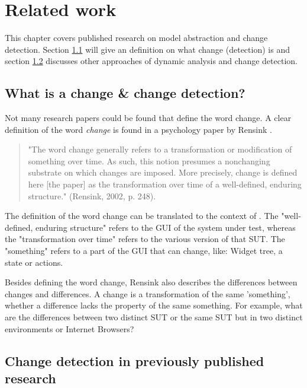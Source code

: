 \chapter{Related work} \label{chapter:related-work}

This chapter covers published research on model abstraction and change detection. Section \ref{sec:what-is-change} will give an definition on what change (detection) is and section \ref{sec:change-detection-research} discusses other approaches of dynamic analysis and change detection. 

\section{What is a change \& change detection?} \label{sec:what-is-change}

Not many research papers could be found that define the word change. A clear definition of the word \textit{change} is found in a psychology paper by Rensink \cite{rensink2002change}.

\begin{quote}
    "The word change generally refers to a transformation or modification of something over time. As such, this notion presumes a nonchanging substrate on which changes are imposed. More precisely, change is defined here [the paper] as the transformation over time of a well-defined, enduring structure." (Rensink, 2002, p. 248).
\end{quote}

The definition of the word change can be translated to the context of \testar. The "well-defined, enduring structure" refers to the GUI of the system under test, whereas the "transformation over time" refers to the various version of that SUT. The "something" refers to a part of the GUI that can change, like: Widget tree, a state or actions. 

Besides defining the word change, Rensink also describes the differences between changes and differences. A change is a transformation of the same 'something', whether a difference lacks the property of the same something. For example, what are the differences between two distinct SUT or the same SUT but in two distinct environments or Internet Browsers?

\section{Change detection in previously published research} \label{sec:change-detection-research}

